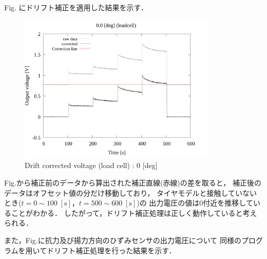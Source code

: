Fig. にドリフト補正を適用した結果を示す．

\begin{figure}[htbp]
  \footnotesize
  \begin{center}
    \includegraphics[width=95mm]{../../02_workspace/result/2-1/plot/02-1_loadcell/02_loadcell-drift_0.png}
    \caption{Drift corrected voltage (load cell) : 0 [deg]}
  \end{center}
\end{figure}

Fig.から補正前のデータから算出された補正直線(赤線)の差を取ると，
補正後のデータはオフセット値の分だけ移動しており，
タイヤモデルと接触していないとき($t = 0 \sim 100 \; [\mathrm{s}]$，$t = 500 \sim 600 \; [\mathrm{s}]$)の
出力電圧の値は0付近を推移していることがわかる．
したがって，ドリフト補正処理は正しく動作していると考えられる．

また，Fig.に抗力及び揚力方向のひずみセンサの出力電圧について
同様のプログラムを用いてドリフト補正処理を行った結果を示す．

